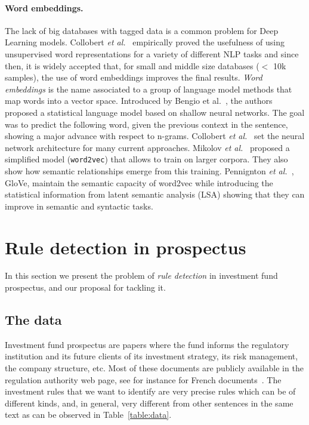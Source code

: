 \documentclass[11pt,a4paper]{article}
\begin{document}
\paragraph{Word embeddings.}The lack of big databases with tagged data is a common problem for Deep Learning models.  Collobert \emph{et al.}~\cite{collobert2011natural} empirically proved the usefulness of using unsupervised word representations for a variety of different NLP tasks and since then, it is widely accepted that, for small and middle size databases ($<$ 10k samples), the use of word embeddings improves the final results. \emph{Word embeddings} is the name associated to a group of language model methods that map words into a vector space. Introduced by Bengio et al.~\cite{bengio2003neural}, the authors proposed a statistical language model based on shallow neural networks. The goal was to predict the following word, given the previous context in the sentence, showing a major advance with respect to n-grams. Collobert \emph{et al.}~\cite{collobert2011natural} set the neural network architecture for many current approaches. Mikolov \emph{et al.}~\cite{mikolov2013efficient} proposed a simplified model (\texttt{word2vec}) that allows to train on larger corpora. They also show how semantic relationships emerge from this training. Pennignton \emph{et al.}~\cite{pennington2014glove}, GloVe, maintain the semantic capacity of word2vec while introducing the statistical information from latent semantic analysis (LSA) showing that they can improve in semantic and syntactic tasks.



\section{Rule detection in prospectus}
In this section we present the problem of \emph{rule detection} in investment fund prospectus, and our proposal for tackling it. 
\subsection{The data}\label{thedata}
Investment fund prospectus are papers where the fund informs the regulatory institution and its future clients of its investment strategy, its risk management, the company structure, etc. Most of these documents are publicly available in the regulation authority web page, see for instance for French documents~\cite{amfgeco}. The investment rules that we want to identify are very precise rules which can be of different kinds, and, in general, very different from other sentences in the same text as can be observed in Table~\ref{table:data}. 
\end{document}
